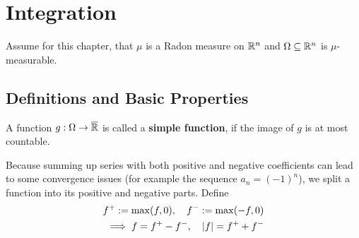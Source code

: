 \section{Integration}
Assume for this chapter, that $\mu$ is a Radon measure on $\mathbb{R}^{n}$ and $\Omega \subseteq \mathbb{R}^{n}$ is $\mu$-measurable.

\subsection{Definitions and Basic Properties}

\begin{dfn}[]
A function $g: \Omega \to \overline{\mathbb{R}}$ is called a \textbf{simple function}, if the image of $g$ is at most countable.
\end{dfn}

Because summing up series with both positive and negative coefficients can lead to some convergence issues (for example the sequence $a_n = (-1)^{n}$), we split a function into its positive and negative parts.
Define
\begin{align*}
  f^{+} := \max(f,0), \quad f^{-} := \max(-f,0)\\
  \implies f = f^{+} - f^{-}, \quad \vert f\vert = f^{+} + f^{-}
\end{align*}


